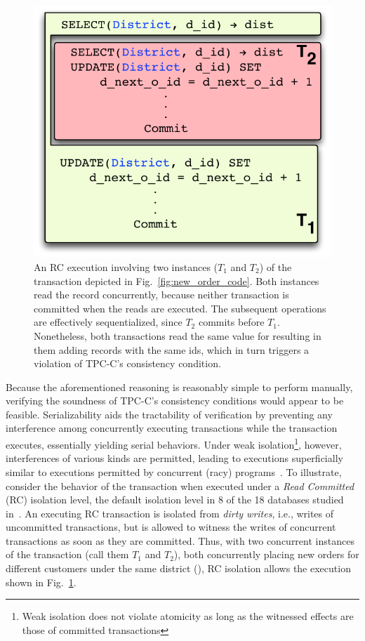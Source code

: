 \begin{figure}
\includegraphics[scale=0.45]{Figures/motiv-eg-1-b}
\caption{\small An RC execution involving two instances ($T_1$ and
  $T_2$) of the  transaction depicted in
  Fig.~\ref{fig:new_order_code}. 
  Both instances read the   record concurrently,
  because neither transaction is committed when the reads are
  executed.  The subsequent operations are effectively sequentialized,
  since $T_2$ commits before $T_1$. Nonetheless, both transactions read the same value for
   resulting in them  adding  records
  with the same ids, which in turn triggers a violation of TPC-C's
  consistency condition.}
\label{fig:new_order_exec}
\end{figure}
Because the aforementioned reasoning is reasonably simple to perform
manually, verifying the soundness of TPC-C's consistency conditions
would appear to be feasible.  Serializability aids the tractability of
verification by preventing any interference among concurrently
executing transactions while the  transaction executes,
essentially yielding serial behaviors.  Under weak
isolation\footnote{Weak isolation does not violate atomicity as long
  as the witnessed effects are those of committed transactions},
however, interferences of various kinds are permitted, leading to
executions superficially similar to executions permitted by concurrent
(racy) programs~\cite{GHE15,HPQ+15}.  To illustrate, consider the
behavior of the  transaction when executed under a
\emph{Read Committed} (RC) isolation level, the default isolation
level in 8 of the 18 databases studied in~\cite{bailishotos}.
An executing RC transaction is isolated from \emph{dirty writes},
i.e., writes of uncommitted transactions, but is allowed to witness
the writes of concurrent transactions as soon as they are committed.
Thus, with two concurrent instances of the  transaction
(call them $T_1$ and $T_2$), both concurrently placing new orders for
different customers under the same district (), RC isolation
allows the execution shown in Fig.~\ref{fig:new_order_exec}.


